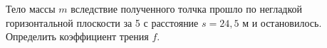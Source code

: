 Тело массы $m$ вследствие полученного толчка прошло по негладкой горизонтальной плоскости за 5 с расстояние $s=24,5$ м 
и остановилось. Определить коэффициент трения $f$.
